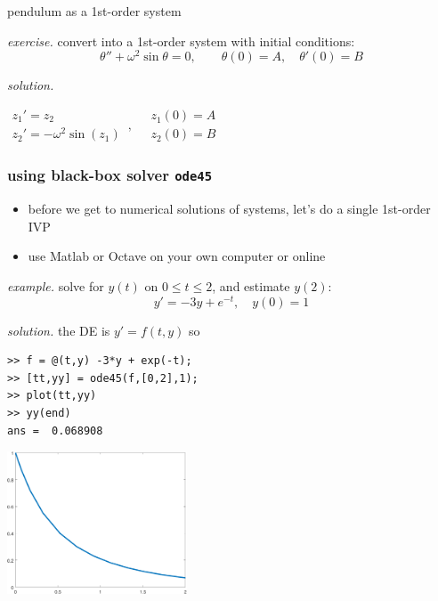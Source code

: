 \documentclass[dvipsnames,colorlinks]{beamer}
\begin{document}
\begin{frame}{pendulum as a 1st-order system}

\noindent \emph{exercise.}  convert into a 1st-order system with initial conditions:
    $$\theta''+ \omega^2 \sin\theta = 0, \qquad \theta(0)=A, \quad \theta'(0)=B$$

\noindent \emph{solution.}  

\vspace{30mm}

\hfill $\displaystyle \boxed{\begin{matrix} z_1' = z_2 \phantom{sdfldfs} \\ z_2' = - \omega^2 \sin(z_1)\end{matrix}\,, \quad \begin{matrix}z_1(0)=A \\ z_2(0)=B\end{matrix}}$
\end{frame}


\begin{frame}[fragile]
\frametitle{using black-box solver \texttt{ode45}}

\begin{itemize}
\item before we get to numerical solutions of systems, let's do a single 1st-order IVP
\item use Matlab or Octave on your own computer or online
\end{itemize}

\noindent \emph{example.}  solve for $y(t)$ on $0 \le t \le 2$, and estimate $y(2)$:
    $$y' = - 3 y + e^{-t}, \quad y(0)=1$$

\noindent \emph{solution.} the DE is $y'=f(t,y)$ so

\begin{Verbatim}
>> f = @(t,y) -3*y + exp(-t);
>> [tt,yy] = ode45(f,[0,2],1);
>> plot(tt,yy)
>> yy(end)
ans =  0.068908
\end{Verbatim}

\vspace{-25mm}
\hfill \includegraphics[width=0.4\textwidth]{figs/ode45out}
\end{frame}
\end{document}
